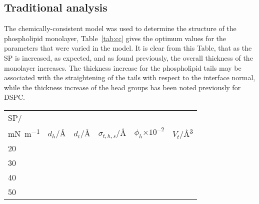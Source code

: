 \subsection{Traditional analysis}
The chemically-consistent model was used to determine the structure of the phospholipid monolayer, Table~\ref{tab:cc} gives the optimum values for the parameters that were varied in the model.
It is clear from this Table, that as the SP is increased, as expected, and as found previously,\autocite{mohwald_phospholipid_1990,vaknin_structural_1991} the overall thickness of the monolayer increases.
The thickness increase for the phospholipid tails may be associated with the straightening of the tails with respect to the interface normal, while the thickness increase of the head groups has been noted previously for DSPC.\autocite{hollinshead_effects_2009}
%
\begin{sidewaystable}
\small
  \caption{\ The values for the parameters allowed to vary in the fitting of the chemically-consistent model, at each SP measured.}
  \label{tab:cc}
  \begin{tabular}{llllll}
    \toprule
    SP/ & & & & & \\
    \si{\milli\newton\per\meter} & $d_h$/\si{\angstrom} & $d_t$/\si{\angstrom} & $\sigma_{t,h,s}$/\si{\angstrom} & $\phi_h$$\times10^{-2}$ & $V_t$/\si{\angstrom\cubed} \\
    \midrule
    20 &  &  &  &  &  \\
    30 &  &  &  &  &  \\
    40 &  &  &  &  &  \\
    50 &  &  &  &  &  \\
    \bottomrule
  \end{tabular}
\end{sidewaystable}
%

